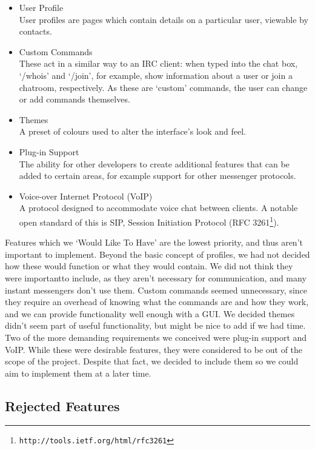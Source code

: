 \begin{itemize}
\item{User Profile\\
	User profiles are pages which contain details on a particular user, viewable by contacts.}
\item{Custom Commands\\
	These act in a similar way to an IRC client: when typed into the chat box, `/whois' and `/join', for example, show information about a user or join a chatroom, respectively. As these are `custom' commands, the user can change or add commands themselves.}
\item{Themes\\
	A preset of colours used to alter the interface's look and feel.}
\item{Plug-in Support\\
	The ability for other developers to create additional features that can be added to certain areas, for example support for other messenger protocols.}
\item{Voice-over Internet Protocol (VoIP)\\
	A protocol designed to accommodate voice chat between clients. A notable open standard of this is SIP, Session Initiation Protocol (RFC 3261\footnote{\texttt{http://tools.ietf.org/html/rfc3261}}).}
\end{itemize}

Features which we `Would Like To Have' are the lowest priority, and thus aren't important to implement. Beyond the basic concept of profiles, we had not decided how these would function or what they would contain. We did not think they were importantto include, as they aren't necessary for communication, and many instant messengers don't use them. Custom commands seemed unnecessary, since they require an overhead of knowing what the commands are and how they work, and we can provide functionality well enough with a GUI. We decided themes didn't seem part of useful functionality, but might be nice to add if we had time. Two of the more demanding requirements we conceived were plug-in support and VoIP. While these were desirable features, they were considered to be out of the scope of the project. Despite that fact, we decided to include them so we could aim to implement them at a later time.


\subsection*{Rejected Features}

